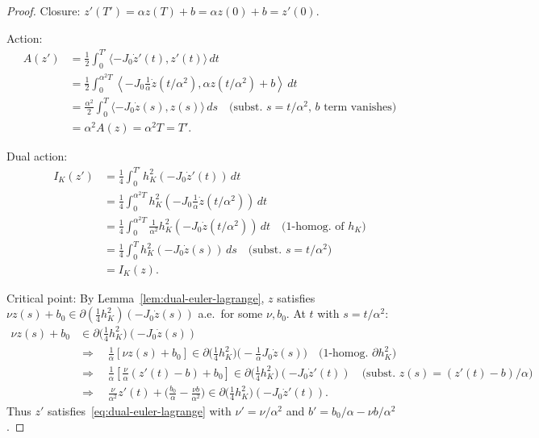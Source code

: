 \begin{proof}
Closure: $z'(T') = \alpha z(T) + b = \alpha z(0) + b = z'(0)$.

Action:
\begin{align*}
  A(z')
  &= \frac{1}{2}\int_0^{T'} \langle -J_0 \dot{z}'(t), z'(t) \rangle\, dt \\
  &= \frac{1}{2}\int_0^{\alpha^2 T} \left\langle -J_0 \frac{1}{\alpha}\dot{z}(t/\alpha^2), \alpha z(t/\alpha^2) + b \right\rangle\, dt \\
  &= \frac{\alpha^2}{2}\int_0^{T} \langle -J_0 \dot{z}(s), z(s) \rangle\, ds
  \quad \text{(subst.\ $s = t/\alpha^2$, $b$ term vanishes)} \\
  &= \alpha^2 A(z) = \alpha^2 T = T'.
\end{align*}

Dual action:
\begin{align*}
  I_K(z')
  &= \frac{1}{4}\int_0^{T'} h_K^2(-J_0\dot{z}'(t))\, dt \\
  &= \frac{1}{4}\int_0^{\alpha^2 T} h_K^2\left(-J_0 \frac{1}{\alpha}\dot{z}(t/\alpha^2)\right)\, dt \\
  &= \frac{1}{4}\int_0^{\alpha^2 T} \frac{1}{\alpha^2} h_K^2(-J_0\dot{z}(t/\alpha^2))\, dt
  \quad \text{(1-homog.\ of $h_K$)} \\
  &= \frac{1}{4}\int_0^{T} h_K^2(-J_0\dot{z}(s))\, ds
  \quad \text{(subst.\ $s = t/\alpha^2$)} \\
  &= I_K(z).
\end{align*}

Critical point: By Lemma~\ref{lem:dual-euler-lagrange}, $z$ satisfies
$\nu z(s) + b_0 \in \partial(\tfrac{1}{4}h_K^2)(-J_0\dot{z}(s))$ a.e.\ for some
$\nu, b_0$. At $t$ with $s = t/\alpha^2$:
\begin{align*}
  \nu z(s) + b_0
  &\in \partial\bigl(\tfrac{1}{4}h_K^2\bigr)(-J_0\dot{z}(s)) \\
  &\Rightarrow \quad
  \frac{1}{\alpha}[\nu z(s) + b_0]
  \in \partial\bigl(\tfrac{1}{4}h_K^2\bigr)\bigl(-\tfrac{1}{\alpha}J_0\dot{z}(s)\bigr)
  \quad \text{(1-homog.\ $\partial h_K^2$)} \\
  &\Rightarrow \quad
  \frac{1}{\alpha}\left[\frac{\nu}{\alpha}(z'(t) - b) + b_0\right]
  \in \partial\bigl(\tfrac{1}{4}h_K^2\bigr)(-J_0\dot{z}'(t))
  \quad \text{(subst.\ $z(s) = (z'(t) - b)/\alpha$)} \\
  &\Rightarrow \quad
  \frac{\nu}{\alpha^2} z'(t) + \biggl(\frac{b_0}{\alpha} - \frac{\nu b}{\alpha^2}\biggr)
  \in \partial\bigl(\tfrac{1}{4}h_K^2\bigr)(-J_0\dot{z}'(t)).
\end{align*}
Thus $z'$ satisfies~\eqref{eq:dual-euler-lagrange} with $\nu' = \nu/\alpha^2$
and $b' = b_0/\alpha - \nu b/\alpha^2$.
\end{proof}

